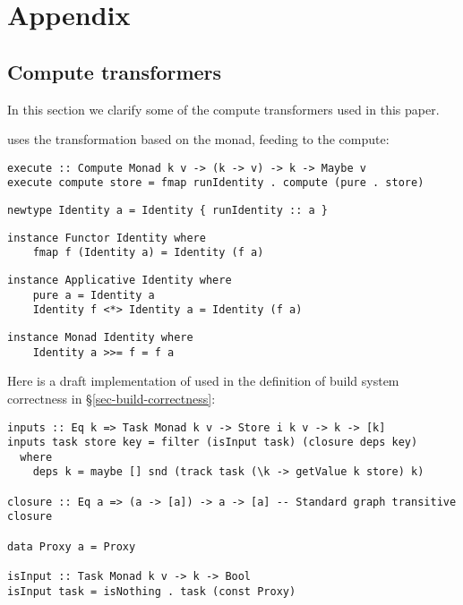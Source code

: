 \clearpage
\section{Appendix}\label{sec-appendix}

\subsection{Compute transformers}\label{sec-appendix-transformers}

In this section we clarify some of the compute transformers used in this paper.

 uses the transformation based on the  monad, feeding
 to the compute:

\begin{verbatim}
execute :: Compute Monad k v -> (k -> v) -> k -> Maybe v
execute compute store = fmap runIdentity . compute (pure . store)
\end{verbatim}
\vspace{1mm}
\begin{verbatim}
newtype Identity a = Identity { runIdentity :: a }
\end{verbatim}
\vspace{1mm}
\begin{verbatim}
instance Functor Identity where
    fmap f (Identity a) = Identity (f a)
\end{verbatim}
\vspace{1mm}
\begin{verbatim}
instance Applicative Identity where
    pure a = Identity a
    Identity f <*> Identity a = Identity (f a)
\end{verbatim}
\vspace{1mm}
\begin{verbatim}
instance Monad Identity where
    Identity a >>= f = f a
\end{verbatim}
\vspace{1mm}




Here is a draft implementation of  used in the definition of
build system correctness in \S\ref{sec-build-correctness}:

\begin{verbatim}
inputs :: Eq k => Task Monad k v -> Store i k v -> k -> [k]
inputs task store key = filter (isInput task) (closure deps key)
  where
    deps k = maybe [] snd (track task (\k -> getValue k store) k)

closure :: Eq a => (a -> [a]) -> a -> [a] -- Standard graph transitive closure

data Proxy a = Proxy

isInput :: Task Monad k v -> k -> Bool
isInput task = isNothing . task (const Proxy)
\end{verbatim}

